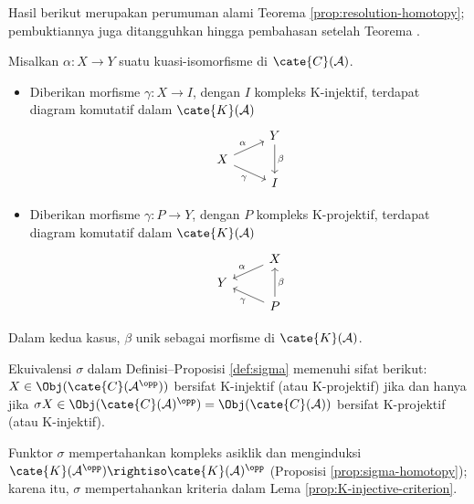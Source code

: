 Hasil berikut merupakan perumuman alami Teorema
\ref{prop:resolution-homotopy}; pembuktiannya juga ditangguhkan hingga
pembahasan setelah Teorema
.

\begin{teorema}\label{prop:K-resolution-homotopy}
	Misalkan $\alpha:X\to Y$ suatu kuasi-isomorfisme di
	$\cate{C}(\mathcal{A})$.
	\begin{itemize}
		\item Diberikan morfisme $\gamma:X\to I$, dengan $I$ kompleks
		K-injektif, terdapat diagram komutatif dalam
		$\cate{K}(\mathcal{A})$
		\[\begin{tikzcd}[row sep=tiny]
			& Y \arrow[dd, "\beta"] \\
			X \arrow[ru, "\alpha"] \arrow[rd, "\gamma"'] & \\
			& I
		\end{tikzcd}\]
		\item Diberikan morfisme $\gamma:P\to Y$, dengan $P$ kompleks
		K-projektif, terdapat diagram komutatif dalam
		$\cate{K}(\mathcal{A})$
		\[\begin{tikzcd}[row sep=tiny]
			& X \arrow[ld, "\alpha"'] \\
			Y & \\
			& P \arrow[lu, "\gamma"] \arrow[uu, "\beta"']
		\end{tikzcd}\]
	\end{itemize}
	Dalam kedua kasus, $\beta$ unik sebagai morfisme di
	$\cate{K}(\mathcal{A})$.
\end{teorema}

\begin{proposisi}\label{prop:K-sigma-duality}
	Ekuivalensi $\sigma$ dalam Definisi--Proposisi \ref{def:sigma} memenuhi
	sifat berikut: $X\in\Obj(\cate{C}(\mathcal{A}^{\opp}))$ bersifat
	K-injektif (atau K-projektif) jika dan hanya jika
	$\sigma X\in\Obj(\cate{C}(\mathcal{A})^{\opp})
	=\Obj(\cate{C}(\mathcal{A}))$ bersifat K-projektif (atau K-injektif).
\end{proposisi}

\begin{bukti}
	Funktor $\sigma$ mempertahankan kompleks asiklik dan menginduksi
	$\cate{K}(\mathcal{A}^{\opp})\rightiso
	\cate{K}(\mathcal{A})^{\opp}$ (Proposisi
	\ref{prop:sigma-homotopy}); karena itu, $\sigma$ mempertahankan kriteria
	dalam Lema \ref{prop:K-injective-criterion}.
\end{bukti}

